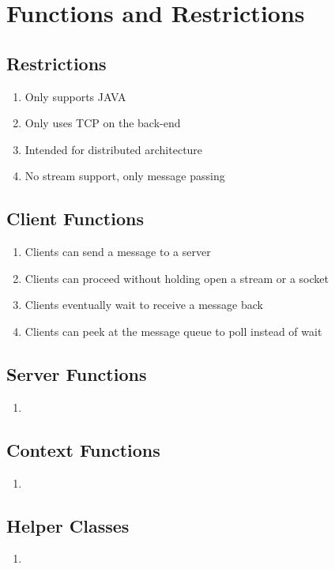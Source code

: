 \documentclass[twoside]{article}
\begin{document}
\section{Functions and Restrictions}

\subsection{Restrictions}

\begin{enumerate}
\item Only supports JAVA
\item Only uses TCP on the back-end
\item Intended for distributed architecture
\item No stream support, only message passing
\end{enumerate}

\subsection{Client Functions}
\begin{enumerate}
    \item Clients can send a message to a server
    \item Clients can proceed without holding open a stream or a socket
    \item Clients eventually wait to receive a message back
    \item Clients can peek at the message queue to poll instead of wait
\end{enumerate}

\subsection{Server Functions}
\begin{enumerate}
    \item 
\end{enumerate}

\subsection{Context Functions}
\begin{enumerate}
    \item 
\end{enumerate}

\subsection{Helper Classes}
\begin{enumerate}
    \item 
\end{enumerate}
\end{document}
